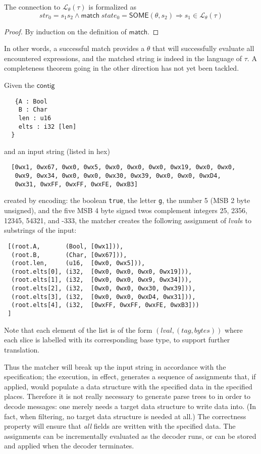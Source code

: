 \documentclass[a4paper,UKenglish,cleveref, autoref, thm-restate]{lipics-v2021}
\newcommand{\konst}[1]{\ensuremath{\mathsf{#1}}}
\newcommand{\imp}{\Rightarrow}
\newcommand{\LangTheta}[1]{\ensuremath{{\mathcal L}_{\theta}({#1})}}
\begin{document}
\begin{theorem}
The connection to $\LangTheta{\tau}$ is formalized as
%
\[
  \mathit{str}_0 = s_1 s_2 \land \konst{match}\; \mathit{state}_0 =
  \konst{SOME}(\theta, s_2) \imp s_1 \in \LangTheta{\tau}
\]
%
\begin{proof}
By induction on the definition of \konst{match}.
\end{proof}
\end{theorem}

In other words, a successful match provides a $\theta$ that will
successfully evaluate all encountered expressions, and the matched
string is indeed in the language of $\tau$. A completeness theorem
going in the other direction has not yet been tackled.

\begin{example}
Given the \konst{contig}

{\small
\begin{verbatim}
   {A : Bool
    B : Char
    len : u16
    elts : i32 [len]
  }
\end{verbatim}
}
\noindent and an input string (listed in hex)
{\small
\begin{verbatim}
  [0wx1, 0wx67, 0wx0, 0wx5, 0wx0, 0wx0, 0wx0, 0wx19, 0wx0, 0wx0,
   0wx9, 0wx34, 0wx0, 0wx0, 0wx30, 0wx39, 0wx0, 0wx0, 0wxD4,
   0wx31, 0wxFF, 0wxFF, 0wxFE, 0wxB3]
\end{verbatim}
}
\noindent created by encoding: the boolean \verb+true+, the letter \verb+g+, the
number 5 (MSB 2 byte unsigned), and the five MSB 4 byte signed twos complement
integers 25, 2356, 12345, 54321, and -333, the matcher creates the
following assignment of $\mathit{lval}$s to substrings of the input:
{\small
\begin{verbatim}
 [(root.A,       (Bool, [0wx1])),
  (root.B,       (Char, [0wx67])),
  (root.len,     (u16,  [0wx0, 0wx5])),
  (root.elts[0], (i32,  [0wx0, 0wx0, 0wx0, 0wx19])),
  (root.elts[1], (i32,  [0wx0, 0wx0, 0wx9, 0wx34])),
  (root.elts[2], (i32,  [0wx0, 0wx0, 0wx30, 0wx39])),
  (root.elts[3], (i32,  [0wx0, 0wx0, 0wxD4, 0wx31])),
  (root.elts[4], (i32,  [0wxFF, 0wxFF, 0wxFE, 0wxB3]))
 ]
\end{verbatim}
}
Note that each element of the list is of the form
$(\mathit{lval},(\mathit{tag},\mathit{bytes}))$ where each slice is labelled with its
corresponding base type, to support further translation.
\end{example}

Thus the matcher will break up the input string in accordance with the
specification; the execution, in effect, generates a sequence of
assignments that, if applied, would populate a data structure with the
specified data in the specified places. Therefore it is not really
necessary to generate parse trees to in order to decode messages: one
merely needs a target data structure to write data into. (In fact,
when filtering, no target data structure is needed at all.) The
correctness property will ensure that \emph{all} fields are written
with the specified data. The assignments can be incrementally
evaluated as the decoder runs, or can be stored and applied when the
decoder terminates.
\end{document}

